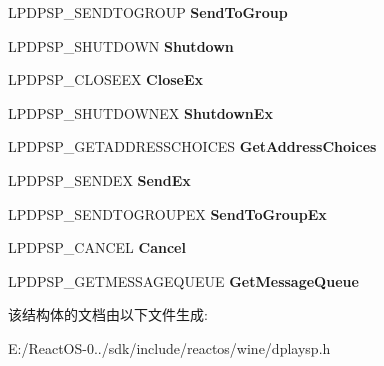 \begin{DoxyCompactItemize}
L\+P\+D\+P\+S\+P\+\_\+\+S\+E\+N\+D\+T\+O\+G\+R\+O\+UP {\bfseries Send\+To\+Group}
\item 
\mbox{\label{structtag_d_p_s_p___s_p_c_a_l_l_b_a_c_k_s_a9666e2a9ae5672d574e74e365cc5e41c}} 
L\+P\+D\+P\+S\+P\+\_\+\+S\+H\+U\+T\+D\+O\+WN {\bfseries Shutdown}
\item 
\mbox{\label{structtag_d_p_s_p___s_p_c_a_l_l_b_a_c_k_s_abba1a796997aeaacb20e262fafd83eba}} 
L\+P\+D\+P\+S\+P\+\_\+\+C\+L\+O\+S\+E\+EX {\bfseries Close\+Ex}
\item 
\mbox{\label{structtag_d_p_s_p___s_p_c_a_l_l_b_a_c_k_s_a7ce325ce7fd7a2c26b7e1171d2d97457}} 
L\+P\+D\+P\+S\+P\+\_\+\+S\+H\+U\+T\+D\+O\+W\+N\+EX {\bfseries Shutdown\+Ex}
\item 
\mbox{\label{structtag_d_p_s_p___s_p_c_a_l_l_b_a_c_k_s_ab2f231587e394e763c7db719110c78f3}} 
L\+P\+D\+P\+S\+P\+\_\+\+G\+E\+T\+A\+D\+D\+R\+E\+S\+S\+C\+H\+O\+I\+C\+ES {\bfseries Get\+Address\+Choices}
\item 
\mbox{\label{structtag_d_p_s_p___s_p_c_a_l_l_b_a_c_k_s_acbadca770b6ead88599348438f4f879a}} 
L\+P\+D\+P\+S\+P\+\_\+\+S\+E\+N\+D\+EX {\bfseries Send\+Ex}
\item 
\mbox{\label{structtag_d_p_s_p___s_p_c_a_l_l_b_a_c_k_s_af83706c6f3b91be8f9addf700b9c5523}} 
L\+P\+D\+P\+S\+P\+\_\+\+S\+E\+N\+D\+T\+O\+G\+R\+O\+U\+P\+EX {\bfseries Send\+To\+Group\+Ex}
\item 
\mbox{\label{structtag_d_p_s_p___s_p_c_a_l_l_b_a_c_k_s_aa77c4b845c2287f7def1a79e09b92668}} 
L\+P\+D\+P\+S\+P\+\_\+\+C\+A\+N\+C\+EL {\bfseries Cancel}
\item 
\mbox{\label{structtag_d_p_s_p___s_p_c_a_l_l_b_a_c_k_s_a36050ec37f1e14557b2233cf3130ef2f}} 
L\+P\+D\+P\+S\+P\+\_\+\+G\+E\+T\+M\+E\+S\+S\+A\+G\+E\+Q\+U\+E\+UE {\bfseries Get\+Message\+Queue}
\end{DoxyCompactItemize}


该结构体的文档由以下文件生成\+:\begin{DoxyCompactItemize}
\item 
E\+:/\+React\+O\+S-\/0../sdk/include/reactos/wine/dplaysp.\+h\end{DoxyCompactItemize}
